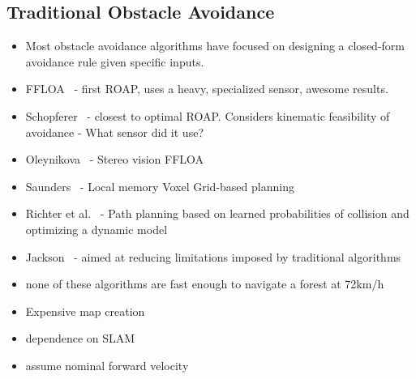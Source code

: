 \documentclass[paper=a4, fontsize=11pt]{scrartcl} %
\begin{document}
	\subsection{Traditional Obstacle Avoidance}
	\begin{itemize}
		\item Most obstacle avoidance algorithms have focused on designing a closed-form avoidance rule given specific inputs.
		\item FFLOA~\cite{Scherer2007} - first ROAP, uses a heavy, specialized sensor, awesome results.
		\item Schopferer~\cite{Schopferer2014} - closest to optimal ROAP.  Considers kinematic feasibility of avoidance - What sensor did it use?
		\item Oleynikova~\cite{Oleynikova2015} - Stereo vision FFLOA
		\item Saunders~\cite{Saunders2009} - Local memory Voxel Grid-based planning
		\item Richter et al.~\cite{Richter2014} - Path planning based on learned probabilities of collision and optimizing a dynamic model
		\item Jackson~\cite{CEPA} - aimed at reducing limitations imposed by traditional algorithms
		\item none of these algorithms are fast enough to navigate a forest at 72km/h
		\item Expensive map creation
		\item dependence on SLAM
		\item assume nominal forward velocity
	\end{itemize}
\end{document}
